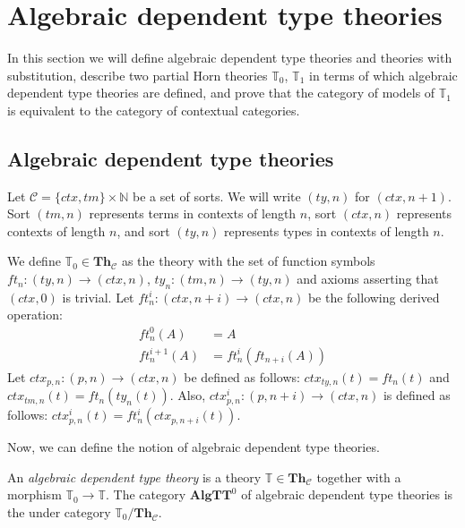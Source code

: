 \documentclass[reqno]{amsart}
\theoremstyle{definition}
\theoremstyle{remark}
\newcommand{\cat}[1]{\mathbf{#1}}
\newcommand{\algtt}{\cat{AlgTT}}
\newcommand{\Th}{\cat{Th}}
\newcommand{\ThC}{\Th_{\mathcal{C}}}
\numberwithin{figure}{section}
\begin{document}
\section{Algebraic dependent type theories}
\label{sec:T1}

In this section we will define algebraic dependent type theories and theories with substitution, describe two partial Horn theories $\mathbb{T}_0$, $\mathbb{T}_1$
    in terms of which algebraic dependent type theories are defined, and prove that the category of models of $\mathbb{T}_1$ is equivalent to the category of contextual categories.

\subsection{Algebraic dependent type theories}

Let $\mathcal{C} = \{ ctx, tm \} \times \mathbb{N}$ be a set of sorts.
We will write $(ty,n)$ for $(ctx,n+1)$.
Sort $(tm,n)$ represents terms in contexts of length $n$, sort $(ctx,n)$ represents contexts of length $n$, and sort $(ty,n)$ represents types in contexts of length $n$.

We define $\mathbb{T}_0 \in \ThC$ as the theory with the set of function symbols $ft_n : (ty,n) \to (ctx,n)$, $ty_n : (tm,n) \to (ty,n)$ and axioms asserting that $(ctx,0)$ is trivial.
Let $ft^i_n : (ctx,n+i) \to (ctx,n)$ be the following derived operation:
\begin{align*}
ft^0_n(A) & = A \\
ft^{i+1}_n(A) & = ft^i_n(ft_{n+i}(A))
\end{align*}
Let $ctx_{p,n} : (p,n) \to (ctx,n)$ be defined as follows: $ctx_{ty,n}(t) = ft_n(t)$ and $ctx_{tm,n}(t) = ft_n(ty_n(t))$.
Also, $ctx^i_{p,n} : (p,n+i) \to (ctx,n)$ is defined as follows: $ctx^i_{p,n}(t) = ft^i_n(ctx_{p,n+i}(t))$.

Now, we can define the notion of algebraic dependent type theories.

\begin{defn}
An \emph{algebraic dependent type theory} is a theory $\mathbb{T} \in \ThC$ together with a morphism $\mathbb{T}_0 \to \mathbb{T}$.
The category $\algtt^0$ of algebraic dependent type theories is the under category $\mathbb{T}_0/\ThC$.
\end{defn}
\end{document}
